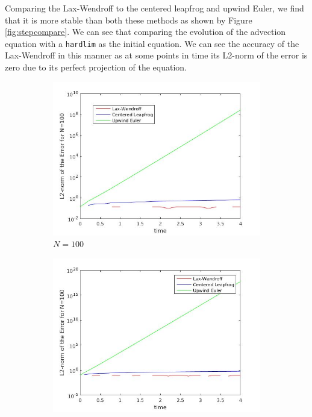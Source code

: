 Comparing the Lax-Wendroff to the centered leapfrog and upwind Euler, we find that it is more stable than both these methods as shown by Figure \ref{fig:stepcompare}. We can see that comparing the evolution of the advection equation with a \texttt{hardlim} as the initial equation. We can see the accuracy of the Lax-Wendroff in this manner as at some points in time its L2-norm of the error is zero due to its perfect projection of the equation.
\begin{figure}[H]
\centering
\begin{subfigure}[b]{0.3\textwidth}
  \centering
  \includegraphics[width=\textwidth]{Images/adv_step_100.jpg}
  \caption{$N=100$}
\end{subfigure}
\hfill
\begin{subfigure}[b]{0.3\textwidth}
  \includegraphics[width=\textwidth]{Images/adv_step_200.jpg}

\end{subfigure}
\end{figure}
